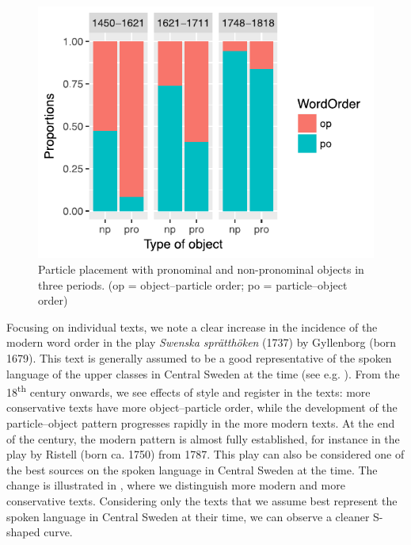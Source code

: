 \documentclass[output=paper]{langscibook}
\begin{document}
  
\begin{figure}
\includegraphics[width=.75\textwidth]{figures/a4-img001.pdf}
\caption{Particle placement with pronominal and non-pronominal objects in three periods. (op = object–particle order; po = particle–object order)\label{fig:lalu:1}} 
\end{figure}


Focusing on individual texts, we note a clear increase in the incidence of the modern word order in the play \textit{Swenska sprätthöken} (1737) by Gyllenborg (born 1679). This text is generally assumed to be a good representative of the spoken language of the upper classes in Central Sweden at the time (see e.g. \citealt{Widmark2000}). From the 18\textsuperscript{th} century onwards, we see effects of style and register in the texts: more conservative texts have more object–particle order, while the development of the particle–object pattern progresses rapidly in the more modern texts. At the end of the century, the modern pattern is almost fully established, for instance in the play by Ristell (born ca. 1750) from 1787. This play can also be considered one of the best sources on the spoken language in Central Sweden at the time. The change is illustrated in , where we distinguish more modern and more conservative texts. Considering only the texts that we assume best represent the spoken language in Central Sweden at their time, we can observe a cleaner S-shaped curve.
\end{document}
